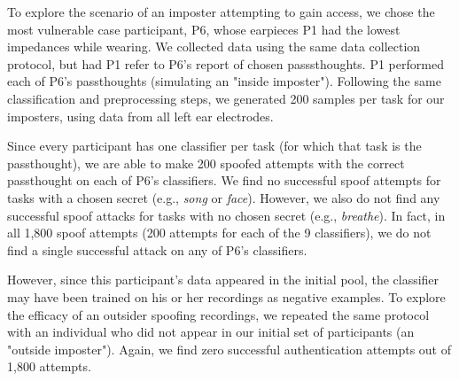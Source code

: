 \documentclass{sigchi}
\begin{document}
To explore the scenario of an imposter attempting to gain access, we chose the most vulnerable case participant, P6, whose earpieces P1 had the lowest impedances while wearing. We collected data using the same data collection protocol, but had P1 refer to P6's report of chosen passsthoughts.
P1 performed each of P6's passthoughts (simulating an "inside imposter"). Following the same classification and preprocessing steps, we generated 200 samples per task for our imposters, using data from all left ear electrodes.


Since every participant has one classifier per task (for which that task is the passthought), we are able to make 200 spoofed attempts with the correct passthought on each of P6's classifiers. We find no successful spoof attempts for tasks with a chosen secret (e.g., \textit{song} or \textit{face}). However, we also do not find any successful spoof attacks for tasks with no chosen secret (e.g., \textit{breathe}). In fact, in all 1,800 spoof attempts (200 attempts for each of the 9 classifiers), we do not find a single successful attack on any of P6's classifiers.

However, since this participant's data appeared in the initial pool, the classifier may have been trained on his or her recordings as negative examples. To explore the efficacy of an outsider spoofing recordings, we repeated the same protocol with an individual who did not appear in our initial set of participants (an "outside imposter"). Again, we find zero successful authentication attempts out of 1,800 attempts.
\end{document}
